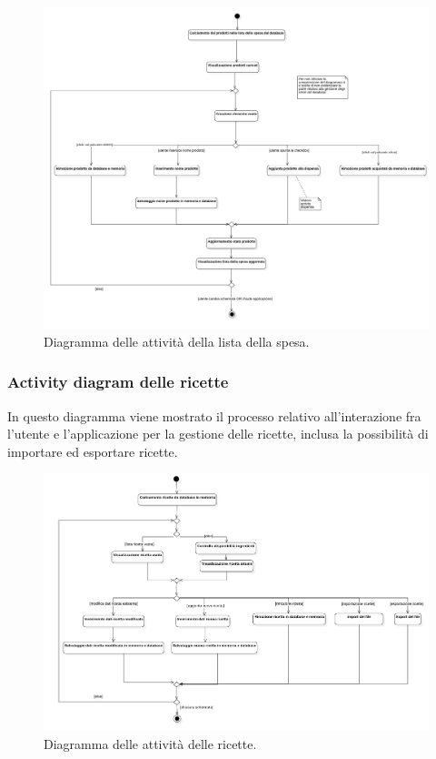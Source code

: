 \documentclass{article}
\begin{document}
\begin{figure}[H]
    \includegraphics[width=\linewidth]{images/activity-shopping-list.png}
    \caption{Diagramma delle attività della lista della spesa.}
    \label{fig:actshoplist}
\end{figure}

\subsubsection{Activity diagram delle ricette}

In questo diagramma viene mostrato il processo relativo all'interazione fra l'utente e l'applicazione per la gestione delle ricette, inclusa la possibilità di importare ed esportare ricette.

\begin{figure}[H]
    \includegraphics[width=\linewidth]{images/activity-recipe.png}
    \caption{Diagramma delle attività delle ricette.}
    \label{fig:actrecipe}
\end{figure}
\end{document}
